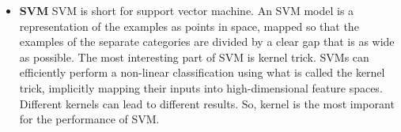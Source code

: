 \begin{itemize}
\item \textbf{SVM}
SVM is short for support vector machine.
An SVM model is a representation of the examples as points in space,
mapped so that the examples of the separate categories are divided
by a clear gap that is as wide as possible.
The most interesting part of SVM is kernel trick.
SVMs can efficiently perform a non-linear classification using what is called the kernel trick,
implicitly mapping their inputs into high-dimensional feature spaces.
Different kernels can lead to different results.
So, kernel is the most imporant for the performance of SVM.
\end{itemize}
